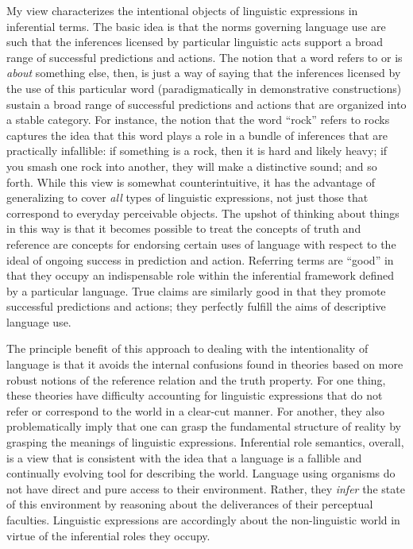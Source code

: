 My view characterizes the intentional objects of linguistic expressions in inferential terms. The basic idea is that the norms governing language use are such that the inferences licensed by particular linguistic acts support a broad range of successful predictions and actions. The notion that a word refers to or is \textit{about} something else, then, is just a way of saying that the inferences licensed by the use of this particular word (paradigmatically in demonstrative constructions) sustain a broad range of successful predictions and actions that are organized into a stable category. For instance, the notion that the word ``rock'' refers to rocks captures the idea that this word plays a role in a bundle of inferences that are practically infallible: if something is a rock, then it is hard and likely heavy; if you smash one rock into another, they will make a distinctive sound; and so forth. While this view is somewhat counterintuitive, it has the advantage of generalizing to cover \textit{all} types of linguistic expressions, not just those that correspond to everyday perceivable objects. The upshot of thinking about things in this way is that it becomes possible to treat the concepts of truth and reference are concepts for endorsing certain uses of language with respect to the ideal of ongoing success in prediction and action. Referring terms are ``good'' in that they occupy an indispensable role within the inferential framework defined by a particular language. True claims are similarly good in that they promote successful predictions and actions; they perfectly fulfill the aims of descriptive language use. 

The principle benefit of this approach to dealing with the intentionality of language is that it avoids the internal confusions found in theories based on more robust notions of the reference relation and the truth property. For one thing, these theories have difficulty accounting for linguistic expressions that do not refer or correspond to the world in a clear-cut manner. For another, they also problematically imply that one can grasp the fundamental structure of reality by grasping the meanings of linguistic expressions. Inferential role semantics, overall, is a view that is consistent with the idea that a language is a fallible and continually evolving tool for describing the world. Language using organisms do not have direct and pure access to their environment. Rather, they \textit{infer} the state of this environment by reasoning about the deliverances of their perceptual faculties. Linguistic expressions are accordingly about the non-linguistic world in virtue of the inferential roles they occupy. 

